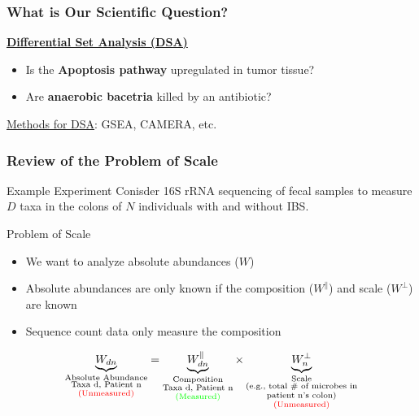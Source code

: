 \documentclass[11pt]{beamer}
\begin{document}
\begin{frame}
  \frametitle{What is Our Scientific Question?}
  
  \begin{center}
    \underline{\textbf{Differential Set Analysis (DSA)}}
  \end{center}

  \begin{itemize}
    \item Is the \textbf{Apoptosis pathway} upregulated in tumor tissue?
    \item Are \textbf{anaerobic bacetria} killed by an antibiotic?
  \end{itemize}

  \vspace{100px}
  \underline{Methods for DSA}: GSEA, CAMERA, etc.
  
\end{frame}

\begin{frame}
  \frametitle{Review of the Problem of Scale}

  \begin{block}{Example Experiment}
    Conisder 16S rRNA sequencing of fecal samples to measure \(D\) taxa in the colons of \(N\) individuals with and without IBS.
  \end{block}

  \pause

  \begin{alertblock}{Problem of Scale}
    \begin{itemize}
      \item We want to analyze absolute abundances (\(W\))
      \item Absolute abundances are only known if the composition (\(W^\parallel\)) and scale (\(W^\perp\)) are known
      \item Sequence count data only measure the composition
    \end{itemize}
  \end{alertblock}
  
  \begin{align*}
    \underbrace{W_{dn}}_{\substack{\text{Absolute Abundance} \\ \text{Taxa d, Patient n} \\ \text{\textcolor{red}{(Unmeasured)}}}} = \underbrace{W^\parallel_{dn}}_{\substack{\text{Composition} \\ \text{Taxa d, Patient n} \\ \text{\textcolor{green}{(Measured)}}}} \times \underbrace{W^\perp_n}_{\substack{\text{Scale} \\ \text{(e.g., total \# of microbes in} \\ \text{patient n's colon)} \\ \text{\textcolor{red}{(Unmeasured)}}}}
  \end{align*}
\end{frame}
\end{document}
